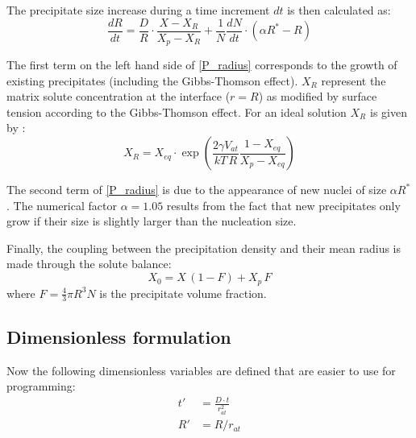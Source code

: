 \documentclass[12pt,a4paper]{article}
\begin{document}
The precipitate size increase during a time increment $dt$ is then calculated as:
\begin{equation}
\label{P_radius}
\frac{dR}{dt} = \frac{D}{R} \cdot \frac{X - X_R}{X_p - X_R} + \frac{1}{N}\frac{dN}{dt} \cdot (\alpha R^* - R)
\end{equation}

The first term on the left hand side of \eqref{P_radius} corresponds to the growth of existing precipitates (including the Gibbs-Thomson effect). $X_R$ represent the matrix solute concentration at the interface ($r=R$) as modified by surface tension according to the Gibbs-Thomson effect. For an ideal solution $X_R$ is given by \citep{Wagner-2005-HomogeneousSecond-P,Calderon-1994-Ostwaldripeningin}:
\begin{equation}
X_R =  X_{eq} \cdot \exp \left( \frac{2\gamma V_{at}}{kT\, R} \frac{1-X_{eq}}{X_p - X_{eq}}\right) 
\end{equation}

The second term of \eqref{P_radius} is due to the appearance of new nuclei of
size $\alpha R^*$. The numerical factor $\alpha = 1.05$ results from the fact that new precipitates only grow if their size is slightly larger than the nucleation size. 

Finally, the coupling between the precipitation density and their mean radius is made through the solute balance:
\begin{equation}
X_0 = X\,(1-F) + X_p\,F
\end{equation}
where $F=\frac{4}{3}\pi R^3 N$ is the precipitate volume fraction.

\subsection{Dimensionless formulation}
Now the following dimensionless variables are defined that are easier to use for programming:
\begin{subequations}
	\begin{align}
t' &= \frac{D\cdot t}{r_{at}^2} \\
R' &= R / r_{at}
	\end{align}
\end{subequations}
\end{document}
